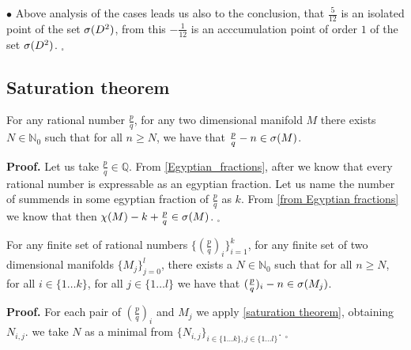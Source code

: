 $\bullet$ Above analysis of the cases leads us also to the conclusion, that $\frac{5}{12}$ 
is 
an isolated point of the set ${{\sigma}(D^2)}$, from this $-\frac{1}{12}$ is an acccumulation point 
of order $1$ of the set ${{\sigma}(D^2)}$. $_\square$ 

\subsection{Saturation theorem}
\begin{theorem}\label{saturation theorem}
For any rational number $\frac{p}{q}$, for any two dimensional manifold $M$
there exists $N\in\mathbb{N}_0$ such that 
for all $n \geq N$, we have that $\frac{p}{q} - n \in {{\sigma}(M)}$.
\end{theorem}
\textbf{Proof.}
Let us take $\frac{p}{q} \in \mathbb{Q}$. 
From \ref{Egyptian_fractions}, after \cite{every number is expressible 
as an egyptian fraction} we know that every rational number is expressable as an egyptian 
fraction. Let us name the number of summends in some egyptian fraction of $\frac{p}{q}$ 
as $k$. From \ref{from Egyptian fractions} we know that then 
$\chi(M) - k + \frac{p}{q} \in {{\sigma}(M)}$.  $_\square$

\begin{corollary}\label{Saturation theorem corollary}
For any finite set of rational numbers $\{(\frac{p}{q})_i\}_{i=1}^k$, for any 
finite set of two dimensional manifolds $\{M_j\}_{j=0}^l$, there exists 
a $N\in\mathbb{N}_0$ such that 
for all $n \geq N$, for all $i\in \{1 \dots k\}$, 
for all $j\in\{1\dots l\}$ we have that  $(\frac{p}{q})_i - n \in {{\sigma}(M_j)}$.
\end{corollary}
\textbf{Proof.}
For each pair of $(\frac{p}{q})_i$ and $M_j$ we apply \ref{saturation theorem}, 
obtaining $N_{i,j}$. 
we take $N$ as a minimal from $\{N_{i,j}\}_{i\in\{1\dots k\}, j\in \{1\dots l\}}$. $_\square$ 

